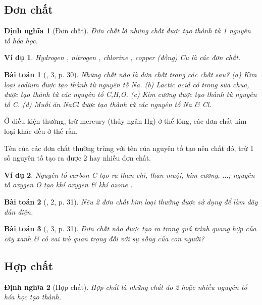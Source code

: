 \documentclass{article}
\newtheorem{baitoan}{Bài toán}
\newtheorem{dinhnghia}{Định nghĩa}
\newtheorem{vidu}{Ví dụ}
\begin{document}
\subsection{Đơn chất}

\begin{dinhnghia}[Đơn chất]
	\emph{Đơn chất} là những chất được tạo thành từ 1 nguyên tố hóa học.
\end{dinhnghia}

\begin{vidu}
	Hydrogen \emph{}, nitrogen \emph{}, chlorine \emph{}, copper (đồng) \emph{Cu} là các đơn chất.
\end{vidu}

\begin{baitoan}[\cite{SGK_KHTN_7_Canh_Dieu}, 3, p. 30]
	Những chất nào là dơn chất trong các chất sau? (a) Kim loại sodium được tạo thành từ nguyên tố \emph{Na}. (b) Lactic acid có trong sữa chua, được tạo thành từ các nguyên tố \emph{C,H,O}. (c) Kim cương được tạo thành từ nguyên tố \emph{C}. (d) Muối ăn \emph{NaCl} được tạo thành từ các nguyên tố \emph{Na} \& \emph{Cl}.
\end{baitoan}
Ở điều kiện thường, trừ mercury (thủy ngân Hg) ở thể lỏng, các đơn chất kim loại khác đều ở thể rắn.

Tên của các đơn chất thường trùng với tên của nguyên tố tạo nên chất đó, trừ 1 số nguyên tố tạo ra được 2 hay nhiều đơn chất.

\begin{vidu}
	Nguyên tố carbon \emph{C} tạo ra than chì, than muội, kim cương, $\ldots$; nguyên tố oxygen \emph{O} tạo khí oxygen \emph{} \& khí ozone \emph{}.
\end{vidu}

\begin{baitoan}[\cite{SGK_KHTN_7_Canh_Dieu}, 2, p. 31]
	Nêu 2 đơn chất kim loại thường được sử dụng để làm dây dẫn điện.
\end{baitoan}

\begin{baitoan}[\cite{SGK_KHTN_7_Canh_Dieu}, 3, p. 31]
	Đơn chất nào được tạo ra trong quá trình quang hợp của cây xanh \& có vai trò quan trọng đối với sự sống của con người?
\end{baitoan}

\subsection{Hợp chất}

\begin{dinhnghia}[Hợp chất]
	\emph{Hợp chất} là những chất do 2 hoặc nhiều nguyên tố hóa học tạo thành.
\end{dinhnghia}
\end{document}
